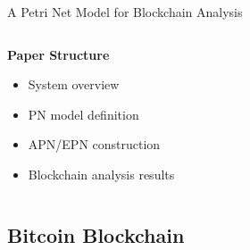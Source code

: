 \documentclass{beamer}
\begin{document}
\begin{frame}{A Petri Net Model for Blockchain Analysis}
\begin{columns}[T]
        \begin{column}{0.5\textwidth}
            \textbf{Paper Structure}
            \begin{itemize}
                \item System overview
                \item PN model definition
                \item APN/EPN construction
                \item Blockchain analysis results
            \end{itemize}
        \end{column}
    \end{columns}
\end{frame}

\subsection{Bitcoin Blockchain}
\end{document}

